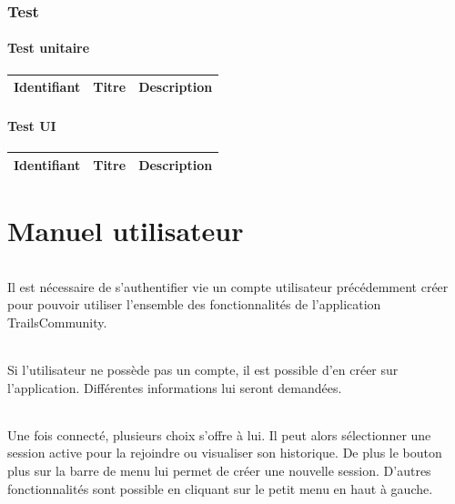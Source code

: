 \documentclass[titlepage, 12pt]{report}
\begin{document}
\section{Test}

\subsection{Test unitaire}

\begin{center}
	\begin{tabular}{|c|c|c|}
		\hline
		Identifiant & Titre & Description \\
		\hline \hline
	\end{tabular}
\end{center}

\subsection{Test UI}

\begin{center}
	\begin{tabular}{|c|c|c|}
		\hline
		Identifiant & Titre & Description \\
		\hline \hline
	\end{tabular}
\end{center}

\part{Manuel utilisateur}

\paragraph{}Il est nécessaire de s'authentifier vie un compte utilisateur précédemment créer pour pouvoir utiliser l'ensemble des fonctionnalités de l'application TrailsCommunity.


\paragraph{}Si l'utilisateur ne possède pas un compte, il est possible d'en créer sur l'application. Différentes informations lui seront demandées.


\paragraph{}Une fois connecté, plusieurs choix s'offre à lui. Il peut alors sélectionner une session active pour la rejoindre ou visualiser son historique. De plus le bouton plus sur la barre de menu lui permet de créer une nouvelle session. D'autres fonctionnalités sont possible en cliquant sur le petit menu en haut à gauche.
\end{document}

